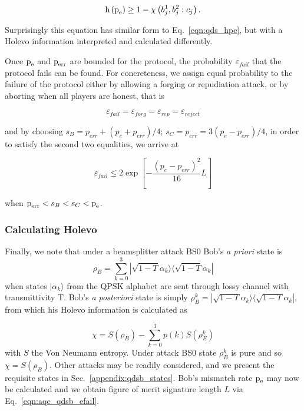 \begin{equation}
\text{h}\left(\text{p}_{\text{e}}\right) \ge 1 - \chi\left(b_j^1, b_j^2 : c_j\right).
\end{equation}

\noindent Surprisingly this equation has similar form to Eq.~\ref{eqn:qds_hpe}, but with a Holevo information interpreted and calculated differently. %


Once $\text{p}_{\text{e}}$ and $\text{p}_{\text{err}}$ are bounded for the protocol, the probability $\varepsilon_{fail}$ that the protocol fails can be found. For concreteness, we assign equal probability to the failure of the protocol either by allowing a forging or repudiation attack, or by aborting when all players are honest, that is

\begin{equation*}
\varepsilon_{fail} = \varepsilon_{forg} = \varepsilon_{rep} = \varepsilon_{reject}
\end{equation*}

\noindent and by choosing $s_B = p_{err} + \left(p_e + p_{err}\right)/4$; $s_C = p_{err} = 3\left(p_e - p_{err}\right)/4$, in order to satisfy the second two equalities, we arrive at 

\begin{equation}\label{eqn:aqc_qdsb_efail}
\varepsilon_{fail} \le 2 \exp \left[ - \frac{\left( p_e - p_{err} \right)^2}{16} L \right]
\end{equation}

\noindent when $\text{p}_{\text{err}}< s_B < s_C < \text{p}_{\text{e}}$.

\subsubsection{Calculating Holevo}

Finally, we note that under a beamsplitter attack BS$0$ Bob's \emph{a priori} state is
\begin{equation}
\rho_B = \sum_{k=0}^3 |\sqrt{1-T}\alpha_k\rangle\langle\sqrt{1-T}\alpha_k|
\end{equation}
when states $|\alpha_k\rangle$ from the QPSK alphabet are sent through lossy channel with transmittivity T. Bob's \emph{a posteriori} state is simply $\rho_{B}^k = |\sqrt{1-T}\alpha_k\rangle\langle \sqrt{1-T}\alpha_k|$, from which his Holevo information is calculated as

\begin{equation}
\chi = S\left(\rho_B\right) - \sum_{k=0}^3 p\left(k\right) S\left(\rho_E^k\right)
\end{equation}
with $S$ the Von Neumann entropy. Under attack BS$0$ state $\rho_B^k$ is pure and so $\chi = S\left(\rho_B\right)$. Other attacks may be readily considered, and we present the requisite states in Sec.~\ref{appendix:qdsb_states}. %
Bob's mismatch rate $\text{p}_{\text{e}}$ may now be calculated and we obtain figure of merit signature length $L$ via Eq.~\ref{eqn:aqc_qdsb_efail}.



